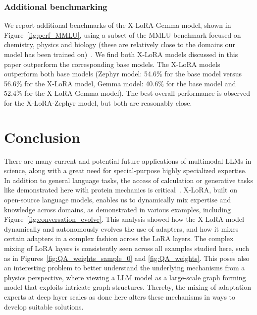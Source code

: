 \subsubsection{Additional benchmarking}
We report additional benchmarks of the X-LoRA-Gemma model, shown in Figure~\ref{fig:perf_MMLU}, using a subset of the MMLU benchmark focused on chemistry, physics and biology (these are relatively close to the domains our model has been trained on)~\cite{Hendrycks2020MeasuringUnderstanding}. We find both X-LoRA models discussed in this paper outperform the corresponding base models. The X-LoRA models outperform both base models (Zephyr model: 54.6\% for the base model versus 56.6\% for the X-LoRA model, Gemma model: 40.6\% for the base model and 52.4\% for the X-LoRA-Gemma model). The best overall performance is observed for the X-LoRA-Zephyr model, but both are reasonably close.





\section{Conclusion}

There are many current and potential future applications of multimodal LLMs in science, along with a great need for special-purpose highly specialized expertise. In addition to general language tasks, the access of calculation or generative tasks like demonstrated here with protein mechanics is critical~\cite{Luu2023BioinspiredLLM:Materials,Buehler2023MechGPTModalities,Buehler2023MeLMProblemsb}. X-LoRA, built on open-source language models, enables us to dynamically mix expertise and knowledge across domains, as demonstrated in various examples, including Figure~\ref{fig:conversation_evolve}. This analysis showed how the X-LoRA model dynamically and autonomously evolves the use of adapters, and how it mixes certain adapters in a complex fashion across the LoRA layers. The complex mixing of LoRA layers is consistently seen across all examples studied here, such as in Figures~\ref{fig:QA_weights_sample_0} and \ref{fig:QA_weights}. This poses also an interesting problem to better understand the underlying mechanisms from a physics perspective, where viewing a LLM model as a large-scale graph forming model that exploits intricate graph structures. Thereby, the mixing of adaptation experts at deep layer scales as done here alters these mechanisms in ways to develop suitable solutions. 

